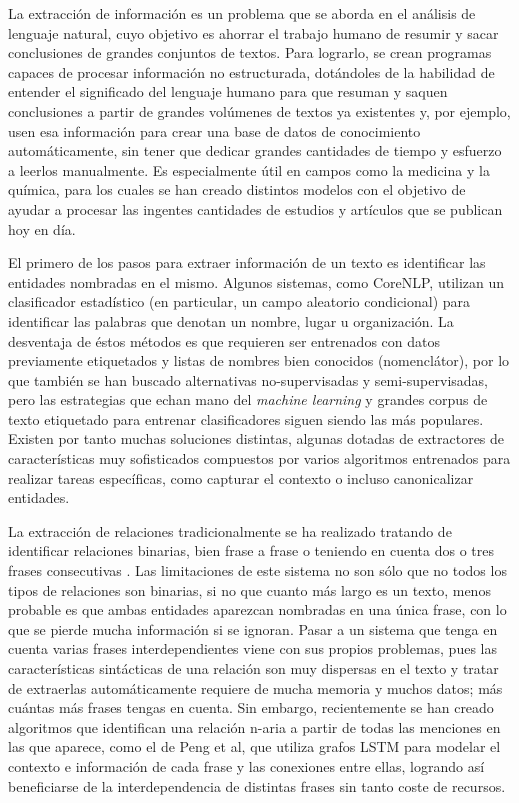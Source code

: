\documentclass{pre-tfg}
\begin{document}
La extracción de información es un problema que se aborda en el análisis de lenguaje natural, cuyo objetivo es ahorrar el trabajo humano de resumir y sacar conclusiones de grandes conjuntos de textos. Para lograrlo, se crean programas capaces de procesar información no estructurada, dotándoles de la habilidad de entender el significado del lenguaje humano para que resuman y saquen conclusiones a partir de grandes volúmenes de textos ya existentes y, por ejemplo, usen esa información para crear una base de datos de conocimiento automáticamente, sin tener que dedicar grandes cantidades de tiempo y esfuerzo a leerlos manualmente. Es especialmente útil en campos como la medicina y la química, para los cuales se han creado distintos modelos\cite{craven_99}\cite{manica_2019} con el objetivo de ayudar a procesar las ingentes cantidades de estudios y artículos que se publican hoy en día.


El primero de los pasos para extraer información de un texto es identificar las entidades nombradas en el mismo. Algunos sistemas, como CoreNLP\cite{corenlp_ner}, utilizan un clasificador estadístico (en particular, un campo aleatorio condicional\cite{lafferty_2011}) para identificar las palabras que denotan un nombre, lugar u organización. La desventaja de éstos métodos es que requieren ser entrenados con datos previamente etiquetados y listas de nombres bien conocidos (nomenclátor), por lo que también se han buscado alternativas no-supervisadas\cite{nothman_2013} y semi-supervisadas\cite{lin_2009}, pero las estrategias que echan mano del \textit{machine learning} y grandes corpus de texto etiquetado para entrenar clasificadores siguen siendo las más populares. Existen por tanto muchas soluciones distintas, algunas dotadas de extractores de características muy sofisticados compuestos por varios algoritmos entrenados para realizar tareas específicas, como capturar el contexto o incluso canonicalizar entidades\cite{wick_2009}.

La extracción de relaciones tradicionalmente se ha realizado tratando de identificar relaciones binarias, bien frase a frase o teniendo en cuenta dos o tres frases consecutivas\cite{zelenko_2003} \cite{craven_99}. Las limitaciones de este sistema no son sólo que no todos los tipos de relaciones son binarias, si no que cuanto más largo es un texto, menos probable es que ambas entidades aparezcan nombradas en una única frase, con lo que se pierde mucha información si se ignoran. Pasar a un sistema que tenga en cuenta varias frases interdependientes viene con sus propios problemas, pues las características sintácticas de una relación son muy dispersas en el texto y tratar de extraerlas automáticamente requiere de mucha memoria y muchos datos; más cuántas más frases tengas en cuenta. Sin embargo, recientemente se han creado algoritmos que identifican una relación n-aria a partir de todas las menciones en las que aparece, como el de Peng et al\cite{peng_17}, que utiliza grafos LSTM para modelar el contexto e información de cada frase y las conexiones entre ellas, logrando así beneficiarse de la interdependencia de distintas frases sin tanto coste de recursos.
\end{document}
